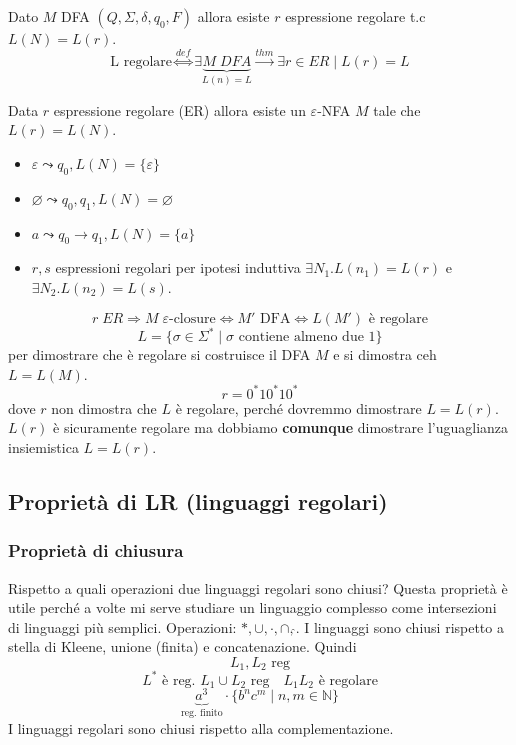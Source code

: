 \documentclass[a4paper]{article}
\begin{document}
{
  Dato $M$ DFA $(Q, \Sigma, \delta, q_0, F)$ allora 
  esiste $r$ espressione regolare t.c $L(N) = L(r)$.
  \[\text{L regolare} \stackrel{def}{\Leftrightarrow} \exists \underbrace{M \; DFA}_{L(n) = L} \stackrel{thm}{\rightarrow} \exists r \in ER \; | \; L(r) = L\]
}
\thm{}
{
  Data $r$ espressione regolare (ER) allora esiste un $\varepsilon$-NFA $M$ tale che $L(r) = L(N)$.
  \begin{itemize}
    \item $\varepsilon \leadsto q_0, L(N) = \{\varepsilon\}$
    \item $\varnothing \leadsto q_0, q_1, L(N) = \varnothing$
    \item $a \leadsto q_0 \rightarrow q_1, L(N) = \{a\}$ 
    \item $r,s$ espressioni regolari per ipotesi induttiva
    $\exists N_1 . L(n_1) = L(r)$ e $\exists N_2 . L(n_2) = L(s)$.
  \end{itemize}
}
\[r \; ER \Rightarrow M \; \varepsilon\text{-closure} \Longleftrightarrow M' \text{ DFA} \Longleftrightarrow L(M') \text{ è regolare}\]
\ex{}
{
  \[L = \{\sigma \in \Sigma^* \; | \; \sigma \text{ contiene almeno due 1}\}\]
  per dimostrare che è regolare si costruisce il DFA $M$ e si dimostra ceh $L = L(M)$.
  \[r = 0^*10^*10^*\]
  dove $r$ non dimostra che $L$ è regolare, perché dovremmo dimostrare $L = L(r)$.
  $L(r)$ è sicuramente regolare ma dobbiamo \textbf{comunque} dimostrare l'uguaglianza insiemistica $L = L(r)$.
}

\subsection{Proprietà di LR (linguaggi regolari)}

\subsubsection{Proprietà di chiusura}

Rispetto a quali operazioni due linguaggi regolari sono chiusi?
Questa proprietà è utile perché a volte mi serve studiare un linguaggio complesso
come intersezioni di linguaggi più semplici.
Operazioni: $*, \cup, \cdot, \cap, \hat{}$.
\thm{}
{
  I linguaggi sono chiusi rispetto a stella di Kleene, unione (finita) e concatenazione.
}
\noindent
Quindi
\[L_1, L_2 \text{ reg}\]
\[L^* \text{ è reg. } L_1 \cup L_2 \text{ reg} \quad L_1L_2 \text{ è regolare} \]
\[\underbrace{a^3}_{\text{reg. finito}} \cdot \{b^nc^m \; | \; n,m \in \mathbb{N}\}\]
\thm{}
{
  I linguaggi regolari sono chiusi rispetto alla complementazione.
}
\end{document}
